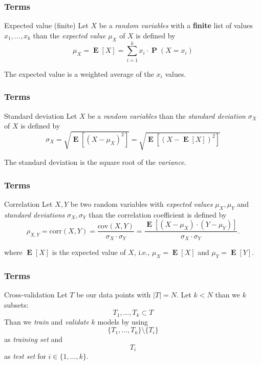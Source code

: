 \documentclass[aspectratio=169]{beamer}
\DeclareMathOperator*{\E}{\mathbf{E}}
\DeclareMathOperator*{\Prob}{\mathbf{P}}
\begin{document}
		\begin{frame}
		\frametitle{Terms}
		\begin{block}{Expected value (finite)}
			Let $X$ be a \textit{random variables} with a \textbf{finite} list of values $x_1, \ldots, x_k$ than the \textit{expected value} $\mu_X$ of $X$ is defined by 
			\begin{equation}
				\mu_X = \E[X] = \sum\limits_{i=1}^k x_i \cdot \Prob(X = x_i)
			\end{equation}
		\end{block}
		The expected value is a weighted average of the $x_i$ values.
	\end{frame}

		\begin{frame}
		\frametitle{Terms}
		\begin{block}{Standard deviation}
			Let $X$ be a \textit{random variables} than the \textit{standard deviation} $\sigma_X$ of $X$ is defined by 
		\begin{equation}
			\sigma_X = \sqrt{\E[(X- \mu_X)^2]} =  \sqrt{\E[(X- \E[X])^2]}
		\end{equation}
		\end{block}
		The standard deviation is the square root of the \textit{variance}.
	\end{frame}

	\begin{frame}
		\frametitle{Terms}
		\begin{block}{Correlation}
			Let $X, Y$ be two random variables with \textit{expected values} $\mu_X, \mu_Y$ and \textit{standard deviations} $\sigma_X, \sigma_Y$ than the correlation coefficient is defined by
			\begin{equation}
				\rho_{X,Y} = \text{corr}(X,Y) = \frac{\text{cov}(X,Y)}{\sigma_X \cdot \sigma_Y} = \frac{\E[(X-\mu_X) \cdot (Y - \mu_Y)]}{\sigma_X \cdot \sigma_Y}.
			\end{equation}
		\end{block}
		where $\E[X]$ is the expected value of $X$, i.e., $\mu_X = \E[X]$ and $\mu_Y = \E[Y]$.
	\end{frame}

	\begin{frame}
		\frametitle{Terms}
		\begin{block}{Cross-validation}
			Let $T$ be our data points with $|T| = N$. Let $k < N$ than we $k$ subsets:
			\begin{equation*}
				T_1, \ldots, T_k \subset T
			\end{equation*}
			Than we \textit{train} and \textit{validate} $k$ models by using 
			\begin{equation*}
				\{T_1, \ldots, T_k\} \setminus \{T_i\}
			\end{equation*}
			as \textit{training set} and
			\begin{equation*}
				T_i
			\end{equation*}
			as \textit{test set} for $i \in \{1, \ldots, k\}$.
		\end{block}
	\end{frame}
\end{document}
